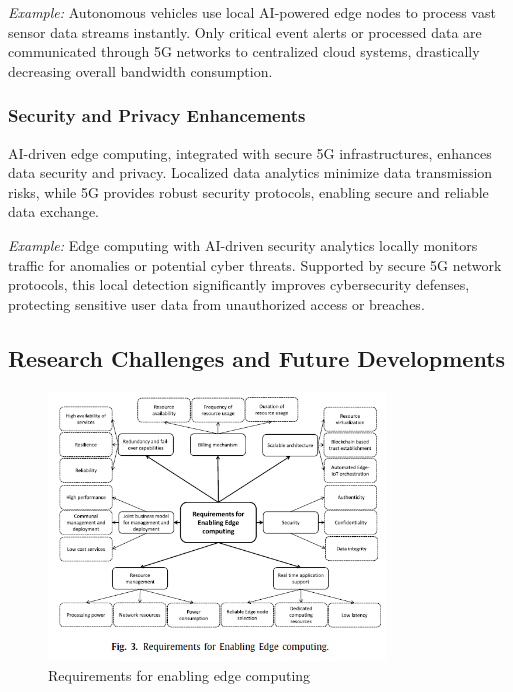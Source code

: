 \documentclass[runningheads]{llncs}
\begin{document}
\noindent\textit{Example:} Autonomous vehicles use local AI-powered edge nodes to process vast sensor data streams instantly. Only critical event alerts or processed data are communicated through 5G networks to centralized cloud systems, drastically decreasing overall bandwidth consumption.

\subsubsection{Security and Privacy Enhancements}
AI-driven edge computing, integrated with secure 5G infrastructures, enhances data security and privacy. Localized data analytics minimize data transmission risks, while 5G provides robust security protocols, enabling secure and reliable data exchange.

\noindent\textit{Example:} Edge computing with AI-driven security analytics locally monitors traffic for anomalies or potential cyber threats. Supported by secure 5G network protocols, this local detection significantly improves cybersecurity defenses, protecting sensitive user data from unauthorized access or breaches.



\subsection{Research Challenges and Future Developments}

\begin{figure}[ht]
    \centering
    \includegraphics[width=0.8\textwidth]{IMG/2.png}
    \caption{Requirements for enabling edge computing}
    \label{fig:edge_requirements}
    \end{figure} 
\FloatBarrier
\end{document}
